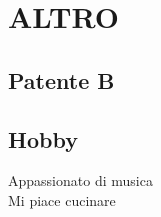 \documentclass[a4paper]{deedy-resume} %
\begin{document}
\begin{minipage}[t]{0.66\textwidth}
\section{ALTRO} 

\subsection{Patente B}

\sectionspace %
\subsection{Hobby}
Appassionato di musica \\
Mi piace cucinare
\sectionspace %

\sectionspace %








\end{minipage}
\end{document}
